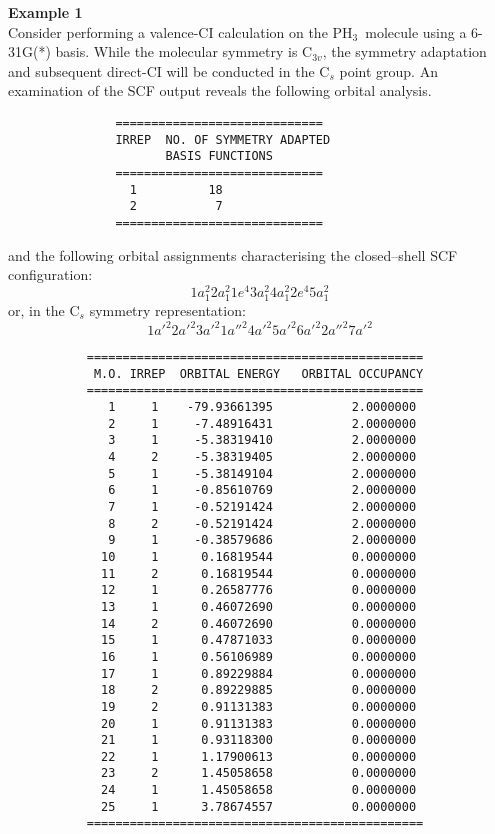 \documentclass[11pt,fleqn]{article}
\newcommand{\phosphine}{\mbox{PH$_{3}$}}
\begin{document}
{\bf Example 1}\\

Consider performing a valence-CI calculation on the \phosphine\ molecule
using a 6-31G(*)  basis. While the molecular symmetry is C$_{3v}$,
the symmetry adaptation  and subsequent direct-CI will be conducted in
the C$_{s}$ point group. An examination of the SCF output reveals the
following orbital analysis.

{
\footnotesize
\begin{verbatim}
               =============================
               IRREP  NO. OF SYMMETRY ADAPTED
                      BASIS FUNCTIONS
               =============================
                 1          18
                 2           7
               =============================
\end{verbatim}
}
and the following orbital assignments characterising the closed--shell
SCF configuration:
\begin{equation}
  1a_{1}^{2}  2a_{1}^{2}  1e^{4}  3a_{1}^{2}  4a_{1}^{2}  2e^{4}  5a_{1}^{2}
\end{equation}
or, in the C$_{s}$ symmetry representation:
\begin{equation}
  1a'^{2}  2a'^{2}  3a'^{2}  1a''^{2}  4a'^{2}  5a'^{2}  6a'^{2} 2a''^{2} 7a'^{2}
\end{equation}
{
\footnotesize
\begin{verbatim}
           ===============================================
            M.O. IRREP  ORBITAL ENERGY   ORBITAL OCCUPANCY
           ===============================================
              1     1    -79.93661395           2.0000000
              2     1     -7.48916431           2.0000000
              3     1     -5.38319410           2.0000000
              4     2     -5.38319405           2.0000000
              5     1     -5.38149104           2.0000000
              6     1     -0.85610769           2.0000000
              7     1     -0.52191424           2.0000000
              8     2     -0.52191424           2.0000000
              9     1     -0.38579686           2.0000000
             10     1      0.16819544           0.0000000
             11     2      0.16819544           0.0000000
             12     1      0.26587776           0.0000000
             13     1      0.46072690           0.0000000
             14     2      0.46072690           0.0000000
             15     1      0.47871033           0.0000000
             16     1      0.56106989           0.0000000
             17     1      0.89229884           0.0000000
             18     2      0.89229885           0.0000000
             19     2      0.91131383           0.0000000
             20     1      0.91131383           0.0000000
             21     1      0.93118300           0.0000000
             22     1      1.17900613           0.0000000
             23     2      1.45058658           0.0000000
             24     1      1.45058658           0.0000000
             25     1      3.78674557           0.0000000
           ===============================================
\end{verbatim}
}
\end{document}
